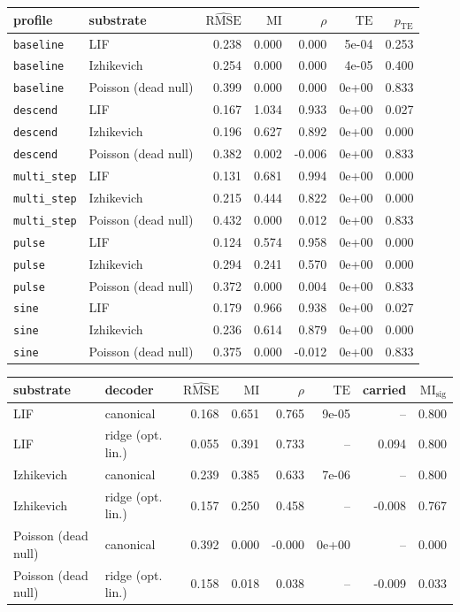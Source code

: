 \begin{tabular}{llrrrrr}
\toprule
profile & substrate & $\widehat{\mathrm{RMSE}}$ & $\mathrm{MI}$ & $\rho$ & $\mathrm{TE}$ & $p_{\mathrm{TE}}$ \\
\midrule
\texttt{baseline} & LIF & 0.238 & 0.000 & 0.000 & 5e-04 & 0.253 \\
\texttt{baseline} & Izhikevich & 0.254 & 0.000 & 0.000 & 4e-05 & 0.400 \\
\texttt{baseline} & Poisson (dead null) & 0.399 & 0.000 & 0.000 & 0e+00 & 0.833 \\
\texttt{descend} & LIF & 0.167 & 1.034 & 0.933 & 0e+00 & 0.027 \\
\texttt{descend} & Izhikevich & 0.196 & 0.627 & 0.892 & 0e+00 & 0.000 \\
\texttt{descend} & Poisson (dead null) & 0.382 & 0.002 & -0.006 & 0e+00 & 0.833 \\
\texttt{multi\_step} & LIF & 0.131 & 0.681 & 0.994 & 0e+00 & 0.000 \\
\texttt{multi\_step} & Izhikevich & 0.215 & 0.444 & 0.822 & 0e+00 & 0.000 \\
\texttt{multi\_step} & Poisson (dead null) & 0.432 & 0.000 & 0.012 & 0e+00 & 0.833 \\
\texttt{pulse} & LIF & 0.124 & 0.574 & 0.958 & 0e+00 & 0.000 \\
\texttt{pulse} & Izhikevich & 0.294 & 0.241 & 0.570 & 0e+00 & 0.000 \\
\texttt{pulse} & Poisson (dead null) & 0.372 & 0.000 & 0.004 & 0e+00 & 0.833 \\
\texttt{sine} & LIF & 0.179 & 0.966 & 0.938 & 0e+00 & 0.027 \\
\texttt{sine} & Izhikevich & 0.236 & 0.614 & 0.879 & 0e+00 & 0.000 \\
\texttt{sine} & Poisson (dead null) & 0.375 & 0.000 & -0.012 & 0e+00 & 0.833 \\
\bottomrule
\end{tabular}

\begin{tabular}{llrrrrrr}
\toprule
substrate & decoder & $\widehat{\mathrm{RMSE}}$ & $\mathrm{MI}$ & $\rho$ & $\mathrm{TE}$ & carried & $\mathrm{MI}_{\mathrm{sig}}$ \\
\midrule
LIF & canonical & 0.168 & 0.651 & 0.765 & 9e-05 & -- & 0.800 \\
LIF & ridge (opt. lin.) & 0.055 & 0.391 & 0.733 & -- & 0.094 & 0.800 \\
Izhikevich & canonical & 0.239 & 0.385 & 0.633 & 7e-06 & -- & 0.800 \\
Izhikevich & ridge (opt. lin.) & 0.157 & 0.250 & 0.458 & -- & -0.008 & 0.767 \\
Poisson (dead null) & canonical & 0.392 & 0.000 & -0.000 & 0e+00 & -- & 0.000 \\
Poisson (dead null) & ridge (opt. lin.) & 0.158 & 0.018 & 0.038 & -- & -0.009 & 0.033 \\
\bottomrule
\end{tabular}

